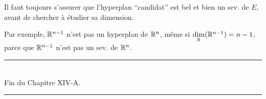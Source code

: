 \documentclass[12pt, a4paper]{report}
\begin{document}
\begin{attention}
    Il faut toujours s'assurer que l'hyperplan ``candidat'' est bel et bien un sev. de $E$, avant de chercher à étudier sa dimension.

    Par exemple, $\mathbb{R}^{n-1}$ n'est pas un hyperplan de $\mathbb{R}^n$, même si $\underset{\mathbb{R}}\dim(\mathbb{R}^{n-1}) = n-1$, parce que $\mathbb{R}^{n-1}$ n'est pas un sev. de $\mathbb{R}^n$.
\end{attention}

\begin{center}
    \rule{0.5\textwidth}{1pt}\\
    Fin du Chapitre XIV-A.\\
    \rule{0.5\textwidth}{1pt}
\end{center}

\printindex
\end{document}
